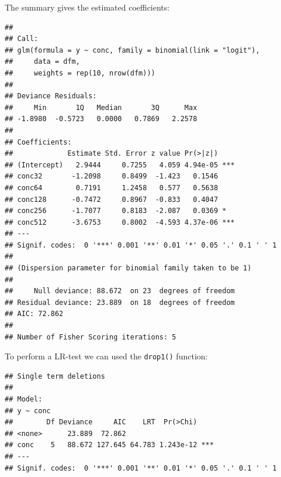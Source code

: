 The summary gives the estimated coefficients:
\begin{knitrout}
\color{fgcolor}\small\begin{kframe}
\begin{alltt}
\end{alltt}
\begin{verbatim}
## 
## Call:
## glm(formula = y ~ conc, family = binomial(link = "logit"), 
##     data = dfm, 
##     weights = rep(10, nrow(dfm)))
## 
## Deviance Residuals: 
##     Min       1Q   Median       3Q      Max  
## -1.8980  -0.5723   0.0000   0.7869   2.2578  
## 
## Coefficients:
##             Estimate Std. Error z value Pr(>|z|)    
## (Intercept)   2.9444     0.7255   4.059 4.94e-05 ***
## conc32       -1.2098     0.8499  -1.423   0.1546    
## conc64        0.7191     1.2458   0.577   0.5638    
## conc128      -0.7472     0.8967  -0.833   0.4047    
## conc256      -1.7077     0.8183  -2.087   0.0369 *  
## conc512      -3.6753     0.8002  -4.593 4.37e-06 ***
## ---
## Signif. codes:  0 '***' 0.001 '**' 0.01 '*' 0.05 '.' 0.1 ' ' 1
## 
## (Dispersion parameter for binomial family taken to be 1)
## 
##     Null deviance: 88.672  on 23  degrees of freedom
## Residual deviance: 23.889  on 18  degrees of freedom
## AIC: 72.862
## 
## Number of Fisher Scoring iterations: 5
\end{verbatim}
\end{kframe}
\end{knitrout}

To perform a LR-test we can used the \texttt{drop1()} function:
\begin{knitrout}
\color{fgcolor}\small\begin{kframe}
\begin{alltt}
  \hlstd{=} \hlstd{)}
\end{alltt}
\begin{verbatim}
## Single term deletions
## 
## Model:
## y ~ conc
##        Df Deviance     AIC    LRT  Pr(>Chi)    
## <none>      23.889  72.862                     
## conc    5   88.672 127.645 64.783 1.243e-12 ***
## ---
## Signif. codes:  0 '***' 0.001 '**' 0.01 '*' 0.05 '.' 0.1 ' ' 1
\end{verbatim}
\end{kframe}
\end{knitrout}

